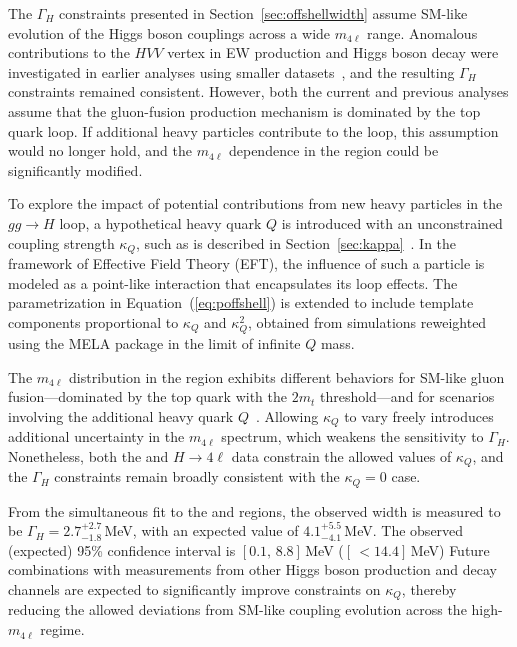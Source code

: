 The $\Gamma_H$ constraints presented in Section~\ref{sec:offshellwidth} assume SM-like evolution of the Higgs boson couplings across a wide $m_{4\ell}$ range. Anomalous contributions to the $HVV$ vertex in EW production and Higgs boson decay were investigated in earlier analyses using smaller datasets~\cite{Sirunyan:2019twz,CMS:2022ley}, and the resulting $\Gamma_H$ constraints remained consistent. However, both the current and previous analyses assume that the gluon-fusion production mechanism is dominated by the top quark loop. If additional heavy particles contribute to the loop, this assumption would no longer hold, and the $m_{4\ell}$ dependence in the \offshell region could be significantly modified.

To explore the impact of potential contributions from new heavy particles in the $gg \to H$ loop, a hypothetical heavy quark $Q$ is introduced with an unconstrained coupling strength $\kappa_Q$, such as is described in Section~\ref{sec:kappa}~\cite{Gritsan:2020pib,Davis:2021tiv}. In the framework of Effective Field Theory (EFT), the influence of such a particle is modeled as a point-like interaction that encapsulates its loop effects. The parametrization in Equation~(\ref{eq:poffshell}) is extended to include template components proportional to $\kappa_Q$ and $\kappa_Q^2$, obtained from simulations reweighted using the MELA package in the limit of infinite $Q$ mass. 

The $m_{4\ell}$ distribution in the \offshell region exhibits different behaviors for SM-like gluon fusion—dominated by the top quark with the $2m_t$ threshold—and for scenarios involving the additional heavy quark $Q$~\cite{Gritsan:2020pib}. Allowing $\kappa_Q$ to vary freely introduces additional uncertainty in the $m_{4\ell}$ spectrum, which weakens the sensitivity to $\Gamma_H$. Nonetheless, both the \onshell and \offshell $H \to 4\ell$ data constrain the allowed values of $\kappa_Q$, and the $\Gamma_H$ constraints remain broadly consistent with the $\kappa_Q = 0$ case.

From the simultaneous fit to the \onshell and \offshell regions, the observed width is measured to be $\Gamma_H = 2.7^{+2.7}_{-1.8}$\,MeV, with an expected value of $4.1^{+5.5}_{-4.1}$\,MeV. The observed (expected) 95\% confidence interval is $[0.1,\,8.8]$\,MeV ($[\,{<}14.4]$\,MeV)
Future combinations with measurements from other \onshell Higgs boson production and decay channels are expected to significantly improve constraints on $\kappa_Q$, thereby reducing the allowed deviations from SM-like coupling evolution across the high-$m_{4\ell}$ regime.

